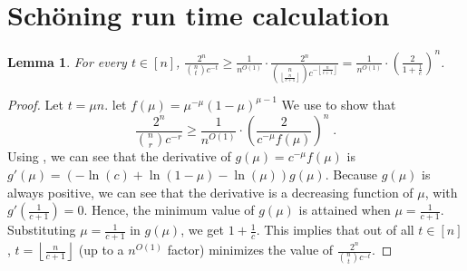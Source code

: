 \documentclass[11pt, letterpaper]{article}
\newtheorem{lemma}[theorem]{Lemma}
\theoremstyle{definition}
\newcommand{\sch}{Sch\"{o}ning\xspace}
\newcommand{\floor}[1]{{\left\lfloor{#1}\right\rfloor}}
\begin{document}
 \section{\sch run time calculation} \label{schcalc}
\begin{lemma} \label{lem:binommax}
    For every $t \in [n]$, $\frac{2^n}{\binom{n}{t} c^{-t}} \geq \frac{1}{n^{O(1)}} \cdot \frac{2^n}{ \binom{n }{ \floor{\frac{n}{c+1}} } c^{-\floor{\frac{n}{c+1}}}} = \frac{1}{n^{O(1)}}\cdot \left(\frac{2}{1+\frac{1}{c}}\right)^n$.
\end{lemma}
\begin{proof}
    Let $t= \mu n$. let $f(\mu)=\mu^{-\mu} (1-\mu)^{\mu-1}$ We use  to show that 
    \[ \frac{2^n}{\binom{n}{r} c^{-r}} \geq \frac{1}{n^{O(1)}} \cdot \left( \frac{2}{c^{-\mu} f(\mu)} \right)^n \; .\]
    Using , we can see that the derivative of $g(\mu)=c^{-\mu} f(\mu)$ is $ g'(\mu)= \left( - \ln(c) + \ln(1-\mu)- \ln(\mu)\right)g(\mu)$. Because $g(\mu)$ is always positive, we can see that the derivative is a decreasing function of $\mu$, with $g'\left(\frac{1}{c+1}\right)=0$. Hence, the minimum value of $g(\mu)$ is attained when $\mu=\frac{1}{c+1}$. Substituting $\mu=\frac{1}{c+1}$ in $g(\mu)$, we get $1+\frac{1}{c}$. This implies that out of all $t \in [n]$, $t=\floor{\frac{n}{c+1}}$ (up to a $n^{O(1)}$ factor) minimizes the value of $\frac{2^n}{\binom{n}{t} c^{-t}}$. 
\end{proof} 
\end{document}
